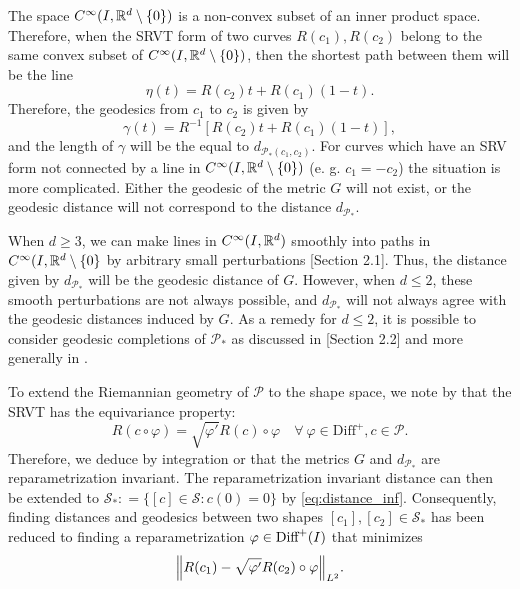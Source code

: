 The space \(C^{\infty}(I, \mathbb{R}^d \setminus \{0\}) \) is a non-convex subset of an inner product space. Therefore, when the SRVT form of two curves \(R(c_1), R(c_2)\) belong to the same convex subset of \(C^{\infty}(I, \mathbb{R}^d \setminus \{0\})\), then the shortest path between them will be the line 
\begin{equation}
  \eta(t) = R(c_2)t +  R(c_1)(1-t). 
\end{equation} 
Therefore, the geodesics from \(c_1\) to \(c_2\) is given by
\begin{equation*}
  \gamma(t) = R^{-1}[R(c_2)t +  R(c_1)(1-t)],
\end{equation*}
and the length of \(\gamma\) will be the equal to \(d_{\mathcal{P}_*(c_1, c_2)}\). For curves which have an SRV form not connected by a line in \(C^{\infty}(I, \mathbb{R}^d \setminus \{0\})\) (e. g. \(c_1 = -c_2\)) the situation is more complicated.  Either the geodesic of the metric \(G\) will not exist, or the geodesic distance will not correspond to the distance \(d_{\mathcal{P}_*}\). 

When \(d \geq 3\),  we can make lines in \(C^{\infty}(I, \mathbb{R}^d )\) smoothly into paths in \(C^{\infty}(I, \mathbb{R}^d \setminus \{0\}\) by arbitrary small perturbations \cite{bauer2014_rprop}[Section 2.1]. Thus, the distance given by \(d_{\mathcal{P}_*}\) will be the geodesic distance of \(G\). However, when \(d \leq 2 \), these smooth perturbations are not always possible, and \(d_{\mathcal{P}_*}\) will not always agree with the geodesic distances induced by \(G\).  As a remedy for \(d \leq 2 \), it is possible to consider geodesic completions of \(\mathcal{P}_* \) as discussed in \cite{bruveris1016_srvtexample}[Section 2.2] and more generally in \cite{bruveris2014_geocomp}.


To extend the Riemannian geometry of \(\mathcal{P}\) to the shape space, we note by \cite{celledoni2016}that the SRVT has the equivariance property:
\begin{equation*}
  R(c \circ \varphi) = \sqrt{\varphi'}R(c) \circ \varphi \quad \forall \ \varphi \in \text{Diff}^+, c \in \mathcal{P}.
\end{equation*}
Therefore, we deduce by integration or \cite[Theorem 3.1]{bauer2014_rprop} that the metrics \(G\) and \(d_{\mathcal{P}_*}\) are reparametrization invariant. The reparametrization invariant distance can then be extended to \(\mathcal{S}_* : = \{[c] \in \mathcal{S}: c(0)=0\}\) by \eqref{eq:distance_inf}. Consequently, finding distances and geodesics between two shapes \([c_1], [c_2]\in \mathcal{S}_*\) has been reduced to finding a reparametrization \(\varphi \in \text{Diff}^+(I)\) that minimizes
\begin{equation} \label{eq:srvt_reparam}
  \norm{R(c_1) - \sqrt{\varphi'} R(c_2)\circ \varphi}_{L^2}.
\end{equation}

